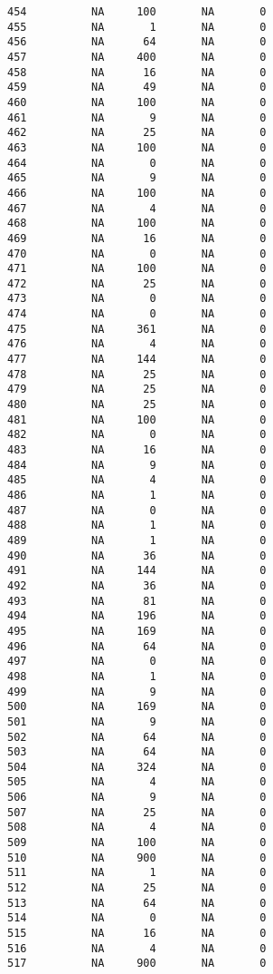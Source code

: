 \documentclass[
  letterpaper,
  DIV=11,
  numbers=noendperiod]{scrreprt}
\begin{document}
\begin{verbatim}
454          NA     100       NA       0
455          NA       1       NA       0
456          NA      64       NA       0
457          NA     400       NA       0
458          NA      16       NA       0
459          NA      49       NA       0
460          NA     100       NA       0
461          NA       9       NA       0
462          NA      25       NA       0
463          NA     100       NA       0
464          NA       0       NA       0
465          NA       9       NA       0
466          NA     100       NA       0
467          NA       4       NA       0
468          NA     100       NA       0
469          NA      16       NA       0
470          NA       0       NA       0
471          NA     100       NA       0
472          NA      25       NA       0
473          NA       0       NA       0
474          NA       0       NA       0
475          NA     361       NA       0
476          NA       4       NA       0
477          NA     144       NA       0
478          NA      25       NA       0
479          NA      25       NA       0
480          NA      25       NA       0
481          NA     100       NA       0
482          NA       0       NA       0
483          NA      16       NA       0
484          NA       9       NA       0
485          NA       4       NA       0
486          NA       1       NA       0
487          NA       0       NA       0
488          NA       1       NA       0
489          NA       1       NA       0
490          NA      36       NA       0
491          NA     144       NA       0
492          NA      36       NA       0
493          NA      81       NA       0
494          NA     196       NA       0
495          NA     169       NA       0
496          NA      64       NA       0
497          NA       0       NA       0
498          NA       1       NA       0
499          NA       9       NA       0
500          NA     169       NA       0
501          NA       9       NA       0
502          NA      64       NA       0
503          NA      64       NA       0
504          NA     324       NA       0
505          NA       4       NA       0
506          NA       9       NA       0
507          NA      25       NA       0
508          NA       4       NA       0
509          NA     100       NA       0
510          NA     900       NA       0
511          NA       1       NA       0
512          NA      25       NA       0
513          NA      64       NA       0
514          NA       0       NA       0
515          NA      16       NA       0
516          NA       4       NA       0
517          NA     900       NA       0

\end{verbatim}
\end{document}
